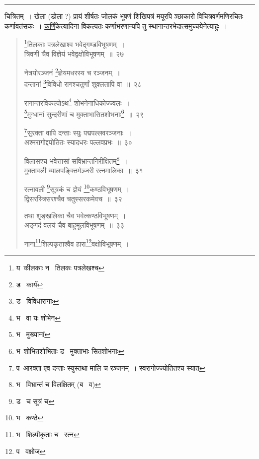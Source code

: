 \documentclass[11pt, openany]{book}
\begin{document}
\hrule

\vspace{2mm}
\noindent
चित्रितम्~। खेला (डोला ?) प्रायं शीर्षतः जोलकं भूषणं शिखिपत्रं मयूरपि ञ्छाकारो विचित्रवर्णमणिरचितः कर्णावतंसकः~। \underline{कर्णिं}केत्यादिना विकल्पतः कर्णाभरणान्यपि तु स्थानान्तरभेदात्समुच्चयेनेत्याहुः~।


\newpage
\lfoot{}

\begin{quote}
{\na \renewcommand{\thefootnote}{1}\footnote{य\textendash\ कीलकाः न \textendash\ तिलकः पत्रलेखश्च}तिलकाः पत्रलेखाश्व भवेद्गण्डविभूषणम्~।\\
त्रिवणी चैव विज्ञेयं भवेद्वक्षोविभूषणम्~॥~२७

नेत्रयोरञ्जनं \renewcommand{\thefootnote}{2}\footnote{ड \textendash\ कार्यं}ज्ञेयमधरस्य च रञ्जनम्~।\\
दन्तानां \renewcommand{\thefootnote}{3}\footnote{ड \textendash\ विविधारागाः}विविधो रागश्चतुर्णां शुक्लतापि वा~॥~२८

रागान्तरविकल्पोऽथ\renewcommand{\thefootnote}{4}\footnote{भ \textendash\ वा यः शोभेन} शोभनेनाधिकोज्ज्वलः~।\\
\renewcommand{\thefootnote}{5}\footnote{भ \textendash\ मुख्यानां}मुग्धानां सुन्दरीणां च मुक्ताभासितशोभनाः\renewcommand{\thefootnote}{6}\footnote{भ\textendash\ शोभितशोभिताः ड \textendash\ मुक्ताभाः सितशोभनाः}~॥~२९

\renewcommand{\thefootnote}{7}\footnote{प\textendash\ आरक्ता एव दन्ताः स्युस्तथा मालि च रञ्जनम्~। स्वरागोज्ज्योतितश्च स्यात्}सुरक्ता वापि दन्ताः स्युः पद्मपल्लवरञ्जनाः~।\\
अश्मरागोद्द्योतितः स्यादधरः पल्लवप्रभः~॥~३०

विलासश्च भवेत्तासां सविभ्रान्तनिरीक्षितम्\renewcommand{\thefootnote}{8}\footnote{भ \textendash\ विभ्रान्तं च विलक्षितम् (ब \textendash\ व)}~।\\
मुक्तावली व्यालपङ्क्तिर्मञ्जरी रत्नमालिका~॥~३१

रत्नावली \renewcommand{\thefootnote}{9}\footnote{ड \textendash\ च सूत्रं च}सूत्रकं च ज्ञेयं \renewcommand{\thefootnote}{10}\footnote{भ \textendash\ कण्ठे}कण्ठविभूषणम्~।\\
द्विसरस्त्रिसरश्चैव चतुस्सरकमेवच~॥~३२

तथा शृङ्खलिका चैव भवेत्कण्ठविभूषणम्~।\\
अङ्गदं वलयं चैव बाहुमूलविभूषणम्~॥~३३

नाना\renewcommand{\thefootnote}{11}\footnote{भ \textendash\ शिल्पीकृताः च \textendash\ रत्न}शिल्पकृताश्वैव हारा\renewcommand{\thefootnote}{12}\footnote{प \textendash\ वक्षोज}वक्षोविभूषणम्~।}
\end{quote}
\end{document}
